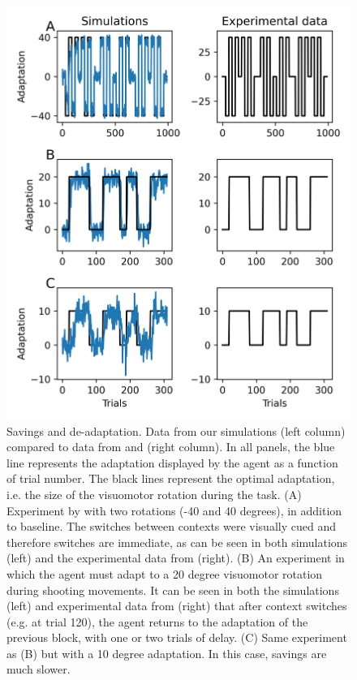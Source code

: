 \documentclass[a4paper,doc,floatsintext,natbib]{apa6}
\begin{document}
\begin{figure}
\centering
\includegraphics{./figures/figure_1.png}
\caption{Savings and de-adaptation. Data from our simulations (left column) compared to data from \cite{Kim_Neural_2015} and \cite{Oh_Minimizing_2019} (right column). In all panels, the blue line represents the adaptation displayed by the agent as a function of trial number. The black lines represent the optimal adaptation, i.e. the size of the visuomotor rotation during the task. (A) Experiment by \cite{Kim_Neural_2015} with two rotations (-40 and 40 degrees), in addition to baseline. The switches between contexts were visually cued and therefore switches are immediate, as can be seen in both simulations (left) and the experimental data from \cite{Kim_Neural_2015} (right). (B) An experiment in which the agent must adapt to a 20 degree visuomotor rotation during shooting movements. It can be seen in both the simulations (left) and experimental data from \cite{Oh_Minimizing_2019} (right) that after context switches (e.g. at trial 120), the agent returns to the adaptation of the previous block, with one or two trials of delay. (C) Same experiment as (B) but  with a 10 degree adaptation. In this case, savings are much slower.} \label{fig:oh-2019}
\end{figure}
\end{document}
